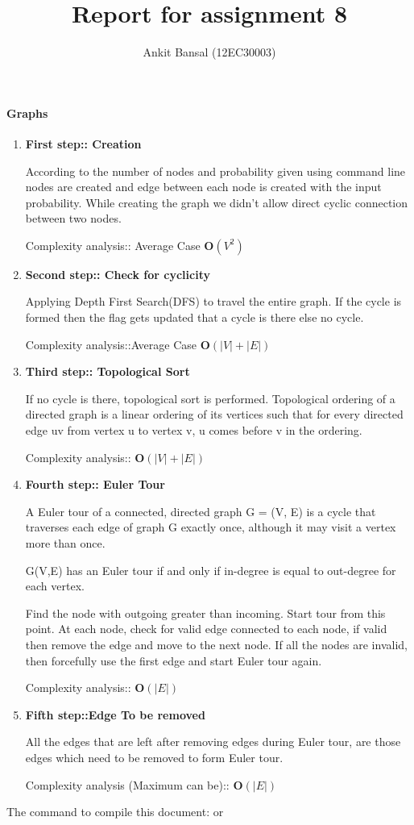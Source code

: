 \documentclass[a4paper,11pt]{article}
\title{Report for assignment 8}
\author{Ankit Bansal (12EC30003)}
\begin{document}
\maketitle

\paragraph{Graphs}
\begin{enumerate}
 \item \textbf{First step:: Creation}

According to the number of nodes and probability given using command line nodes are created and edge between each node is created with the input probability. While creating the graph we didn't allow direct cyclic connection between two nodes.
 

Complexity analysis:: Average Case \textbf{O$\left( V^2 \right)$}


 \item \textbf{Second step:: Check for cyclicity}

Applying Depth First Search(DFS) to travel the entire graph. 
If the cycle is formed then the flag gets updated that a cycle is there else no cycle.

 Complexity analysis::Average Case \textbf{O$\left( |V| + |E| \right)$}
 
\item\textbf{Third step:: Topological Sort}

If no cycle is there, topological sort is performed.  Topological ordering of a directed graph is a linear ordering of its vertices such that for every directed edge uv from vertex u to vertex v, u comes before v in the ordering.

Complexity analysis:: \textbf{O$\left( |V| + |E| \right)$}

\item\textbf{Fourth step:: Euler Tour}

A Euler tour of a connected, directed graph G = (V, E) is a cycle that traverses each edge of graph G exactly once, although it may visit a vertex more than once.

G(V,E) has an Euler tour if and only if in-degree is equal to out-degree for each vertex.

Find the node with outgoing greater than incoming. Start tour from this point. At each node, check for valid edge connected to each node, if valid then remove the edge and move to the next node. If all the nodes are invalid, then forcefully use the first edge and start Euler tour again.

Complexity analysis:: \textbf{O$\left( |E| \right)$}

\item\textbf{Fifth step::Edge To be removed}

All the edges that are left after removing edges during Euler tour, are those edges which need to be removed to form Euler tour. 

Complexity analysis (Maximum can be):: \textbf{O$\left( |E| \right)$}



\end{enumerate}





The command to compile this document:
 or 
\end{document}
